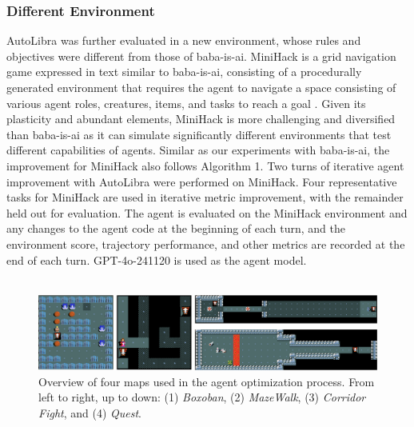 \subsubsection{Different Environment}

AutoLibra was further evaluated in a new environment, whose rules and objectives were different from those of baba-is-ai. MiniHack is a grid navigation game expressed in text similar to baba-is-ai, consisting of a procedurally generated environment that requires the agent to navigate a space consisting of various agent roles, creatures, items, and tasks to reach a goal \cite{samvelyan2021minihackplanetsandboxopenended}. Given its plasticity and abundant elements, MiniHack is more challenging and diversified than baba-is-ai as it can simulate significantly different environments that test different capabilities of agents. Similar as our experiments with baba-is-ai, the improvement for MiniHack also follows Algorithm 1. Two turns of iterative agent improvement with AutoLibra were performed on MiniHack. Four representative tasks for MiniHack are used in iterative metric improvement, with the remainder held out for evaluation. The agent is evaluated on the MiniHack environment and any changes to the agent code at the beginning of each turn, and the environment score, trajectory performance, and other metrics are recorded at the end of each turn. GPT-4o-241120 is used as the agent model.\\
\\
\begin{figure}[ht]
    \centering
    \includegraphics[width=\textwidth]{figs/emojis/maps.png}
    \caption{Overview of four maps used in the agent optimization process. 
    From left to right, up to down: (1) \emph{Boxoban}, (2) \emph{MazeWalk}, (3) \emph{Corridor Fight}, and (4) \emph{Quest}.}
    \label{fig:minihack_maps}
\end{figure}



